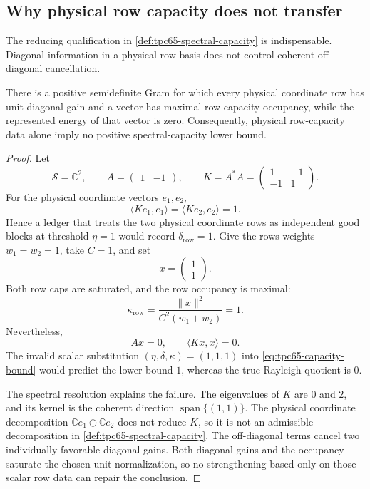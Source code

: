 \subsection{Why physical row capacity does not transfer}

The reducing qualification in \cref{def:tpc65-spectral-capacity} is
indispensable.  Diagonal information in a physical row basis does not control
coherent off-diagonal cancellation.

\begin{proposition}
\label{prop:tpc65-row-capacity-nontransfer}
There is a positive semidefinite Gram for which every physical coordinate row
has unit diagonal gain and a vector has maximal row-capacity occupancy, while
the represented energy of that vector is zero.  Consequently, physical
row-capacity data alone imply no positive spectral-capacity lower bound.
\end{proposition}

\begin{proof}
Let
\begin{equation}
  \mathcal S=\mathbb C^2,
  \qquad
  A=\begin{pmatrix}1&-1\end{pmatrix},
  \qquad
  K=A^*A
  =
  \begin{pmatrix}
    1&-1\\
    -1&1
  \end{pmatrix}.
  \label{eq:tpc65-collision-gram}
\end{equation}
For the physical coordinate vectors \(e_1,e_2\),
\[
  \langle Ke_1,e_1\rangle
  =
  \langle Ke_2,e_2\rangle
  =1.
\]
Hence a ledger that treats the two physical coordinate rows as independent
good blocks at threshold \(\eta=1\) would record
\(\delta_{\mathrm{row}}=1\).  Give the rows weights
\(w_1=w_2=1\), take \(C=1\), and set
\[
  x=\begin{pmatrix}1\\1\end{pmatrix}.
\]
Both row caps are saturated, and the row occupancy is maximal:
\[
  \kappa_{\mathrm{row}}
  =
  \frac{\|x\|^2}{C^2(w_1+w_2)}
  =1.
\]
Nevertheless,
\[
  Ax=0,
  \qquad
  \langle Kx,x\rangle=0.
\]
The invalid scalar substitution
\((\eta,\delta,\kappa)=(1,1,1)\) into
\eqref{eq:tpc65-capacity-bound} would predict the lower bound \(1\), whereas
the true Rayleigh quotient is \(0\).

The spectral resolution explains the failure.  The eigenvalues of \(K\) are
\(0\) and \(2\), and its kernel is the coherent direction
\(\operatorname{span}\{(1,1)\}\).  The physical coordinate decomposition
\(\mathbb Ce_1\oplus\mathbb Ce_2\) does not reduce \(K\), so it is not an
admissible decomposition in \cref{def:tpc65-spectral-capacity}.  The
off-diagonal terms cancel two individually favorable diagonal gains. Both
diagonal gains and the occupancy saturate the chosen unit normalization, so no
strengthening based only on those scalar row data can repair the conclusion.
\end{proof}


